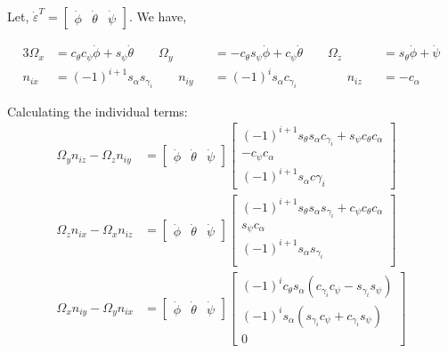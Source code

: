 Let, $\dot \varepsilon^T  = \begin{bmatrix} \dot \phi & \dot \theta & \dot \psi \end{bmatrix}$. We have,

\begin{alignat*}{3}
        \Omega_x &=  c_{\theta}c_{\psi} \dot \phi + s_{\psi} \dot \theta \qquad
        \Omega_y &&= -c_{\theta}s_{\psi} \dot \phi + c_{\psi} \dot \theta \qquad
        \Omega_z &&= s_{\theta} \dot \phi + \dot \psi\\
        n_{ix}   &=  (-1)^{i+1} s_{\alpha} s_{\gamma_i} \qquad
        n_{iy}   &&= (-1)^{i} s_{\alpha} c_{\gamma_i}  \qquad \qquad
        n_{iz}   &&= -c_{\alpha}
\end{alignat*}

Calculating the individual terms:
\begin{align*}
    \Omega_y n_{iz} - \Omega_z n_{iy} &=
    \begin{bmatrix}
        \dot \phi & \dot \theta & \dot \psi
    \end{bmatrix}
    \begin{bmatrix}
        (-1)^{i+1} s_{\theta} s_{\alpha} c_{\gamma_i} + s_{\psi} c_{\theta} c_{\alpha}\\
        -c_{\psi} c_{\alpha}\\
        (-1)^{i+1} s_{\alpha} c{\gamma_i}
    \end{bmatrix}\\
    \Omega_z n_{ix} - \Omega_x n_{iz} &=
    \begin{bmatrix}
        \dot \phi & \dot \theta & \dot \psi
    \end{bmatrix}
    \begin{bmatrix}
        (-1)^{i+1} s_{\theta} s_{\alpha} s_{\gamma_i} + c_{\psi} c_{\theta} c_{\alpha}\\
        s_{\psi} c_{\alpha}\\
        (-1)^{i+1} s_{\alpha} s_{\gamma_i}\\
    \end{bmatrix}\\
    \Omega_x n_{iy} - \Omega_y n_{ix} &=
    \begin{bmatrix}
        \dot \phi & \dot \theta & \dot \psi
    \end{bmatrix}
    \begin{bmatrix}
        (-1)^{i} c_{\theta}s_{\alpha} (c_{\gamma_i}c_{\psi} - s_{\gamma_i} s_{\psi})\\
        (-1)^{i} s_{\alpha} (s_{\gamma_i} c_{\psi} + c_{\gamma_i} s_{\psi})\\
        0
    \end{bmatrix}
\end{align*}
